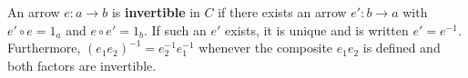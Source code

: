 An arrow $e: a \rightarrow b$ is \textbf{invertible} in $C$ if there exists an arrow $e': b \rightarrow a$ with $e' \circ e = 1_a$ and $e \circ e' = 1_b$. If such an $e'$ exists, it is unique and is written $e' = e^{-1}$. Furthermore, $(e_1 e_2)^{-1} = e_2^{-1} e_1^{-1}$ whenever the composite $e_1 e_2$ is defined and both factors are invertible.